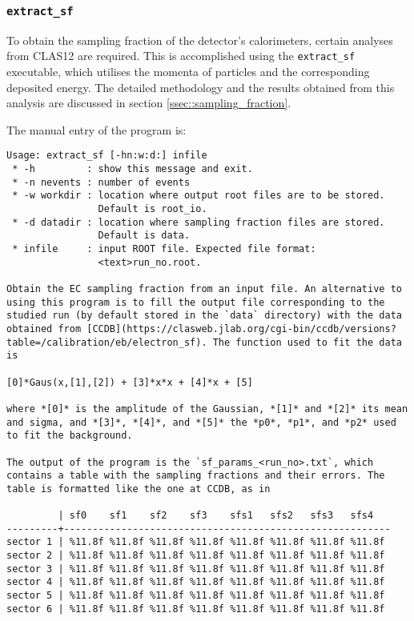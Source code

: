 \subsubsection{\texttt{extract\_sf}}
\label{sssec::extract_sf}
    To obtain the sampling fraction of the detector's calorimeters, certain analyses from CLAS12 are required.
    This is accomplished using the \texttt{extract\_sf} executable, which utilises the momenta of particles and the corresponding deposited energy.
    The detailed methodology and the results obtained from this analysis are discussed in section \ref{ssec::sampling_fraction}.

    The manual entry of the program is:
    \begin{lstlisting}
Usage: extract_sf [-hn:w:d:] infile
 * -h         : show this message and exit.
 * -n nevents : number of events
 * -w workdir : location where output root files are to be stored.
                Default is root_io.
 * -d datadir : location where sampling fraction files are stored.
                Default is data.
 * infile     : input ROOT file. Expected file format:
                <text>run_no.root.

Obtain the EC sampling fraction from an input file. An alternative to using this program is to fill the output file corresponding to the studied run (by default stored in the `data` directory) with the data obtained from [CCDB](https://clasweb.jlab.org/cgi-bin/ccdb/versions?table=/calibration/eb/electron_sf). The function used to fit the data is

[0]*Gaus(x,[1],[2]) + [3]*x*x + [4]*x + [5]

where *[0]* is the amplitude of the Gaussian, *[1]* and *[2]* its mean and sigma, and *[3]*, *[4]*, and *[5]* the *p0*, *p1*, and *p2* used to fit the background.

The output of the program is the `sf_params_<run_no>.txt`, which contains a table with the sampling fractions and their errors. The table is formatted like the one at CCDB, as in

         | sf0    sf1    sf2    sf3    sfs1   sfs2   sfs3   sfs4
---------+---------------------------------------------------------
sector 1 | %11.8f %11.8f %11.8f %11.8f %11.8f %11.8f %11.8f %11.8f
sector 2 | %11.8f %11.8f %11.8f %11.8f %11.8f %11.8f %11.8f %11.8f
sector 3 | %11.8f %11.8f %11.8f %11.8f %11.8f %11.8f %11.8f %11.8f
sector 4 | %11.8f %11.8f %11.8f %11.8f %11.8f %11.8f %11.8f %11.8f
sector 5 | %11.8f %11.8f %11.8f %11.8f %11.8f %11.8f %11.8f %11.8f
sector 6 | %11.8f %11.8f %11.8f %11.8f %11.8f %11.8f %11.8f %11.8f
    \end{lstlisting}
